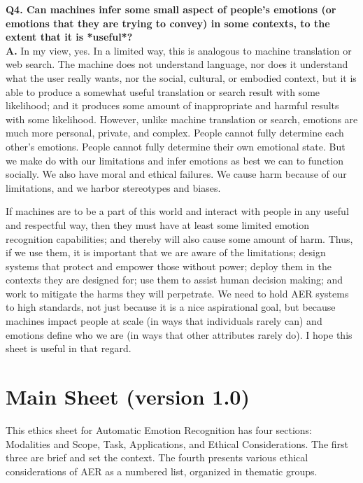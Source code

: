 \documentclass{clv3}
\begin{document}
\noindent \textbf{Q4. Can machines infer some small aspect of people’s emotions (or emotions that they are trying to convey) %
in some contexts, to the extent that it is *useful*?}\\[2pt]  %
\noindent \textbf{A.} In my view, yes. In a limited way, this is analogous to machine translation or web search. The machine does not understand language, nor does it understand what the user really wants, nor the social, cultural, or embodied context, but it is able to produce a somewhat useful translation or search result with some likelihood; and it produces some amount of inappropriate and harmful results with some likelihood. However, unlike machine translation or search, emotions are much more personal, private, and complex.
People cannot fully determine each other's emotions. People cannot fully determine their own emotional state. But we make do with our limitations and infer emotions as best we can to function socially. 
We also have moral and ethical failures. We cause harm because of our limitations, and we harbor stereotypes and biases.

If machines are to be a part of this world and interact with people in any useful and respectful way, then they must have at least some limited emotion recognition capabilities; and thereby will also cause some amount of harm.
Thus, if we use them, it is important that we are aware of the limitations; design systems that protect and empower those without power; deploy them in the contexts they are designed for; use them to assist human decision making; and work to mitigate the harms they will perpetrate.
We need to hold AER systems to high standards, not just because it is a nice aspirational goal, but because machines impact people at scale (in ways that individuals rarely can) and emotions define who we are (in ways that other attributes rarely do).
I hope this sheet is useful in that regard.


\section{Main Sheet (version 1.0)}

This ethics sheet for Automatic Emotion Recognition has four sections: Modalities and Scope, Task, Applications, and Ethical Considerations. The first three are brief and set the context. The fourth presents various ethical considerations of AER as a numbered list, organized in thematic groups.
\end{document}
